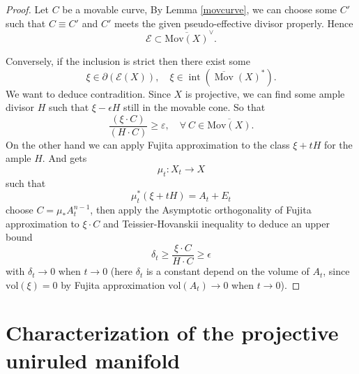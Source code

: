 \documentclass[11pt]{article}
\theoremstyle{definition}
\begin{document}
	\begin{proof}
		Let $C$ be a movable curve, By Lemma \ref{movcurve}, we can choose some $C'$ such that $C \equiv C'$ and $C'$ meets the given pseudo-effective divisor properly. Hence $$\mathcal{E} \subset \overline{\text{Mov}(X)}^\vee.$$
		
		Conversely, if the inclusion is strict then there exist some  $$\xi \in \partial(\mathcal{E}(X)), \quad \xi \in \operatorname{int}\left(\overline{\operatorname{Mov}}(X)^*\right) .$$We want to deduce contradition. Since $X$ is projective, we can find some ample divisor $H$ such that $\xi - \epsilon H$ still in the movable cone. So that $$
		\frac{(\xi \cdot C)}{(H \cdot C)} \geq \varepsilon
		, \quad \forall \ C \in \overline{\text{Mov}(X)}.$$
		On the other hand we can apply Fujita approximation to the class $\xi+ t H$ for the ample $H$. And gets $$\mu_t :X_t \to X$$such that $$\mu_t^* (\xi + t H) = A_t + E_t$$choose $C  = \mu_*  A_t^{n-1}$, then apply the Asymptotic orthogonality of Fujita approximation to $\xi \cdot C$ and Teissier-Hovanskii inequality to deduce an upper bound $$\delta_t \ge \frac{\xi \cdot C}{ H \cdot C} \ge \epsilon$$with $\delta_t \to 0$ when $t\to 0$ (here $\delta_t$ is a constant depend on the volume of $A_t$, since $\text{vol}(\xi) = 0$ by Fujita approximation $\text{vol}(A_t) \to 0$ when $t\to 0$).
		
	\end{proof}
	\section{Characterization of the projective uniruled manifold}
	
\end{document}
